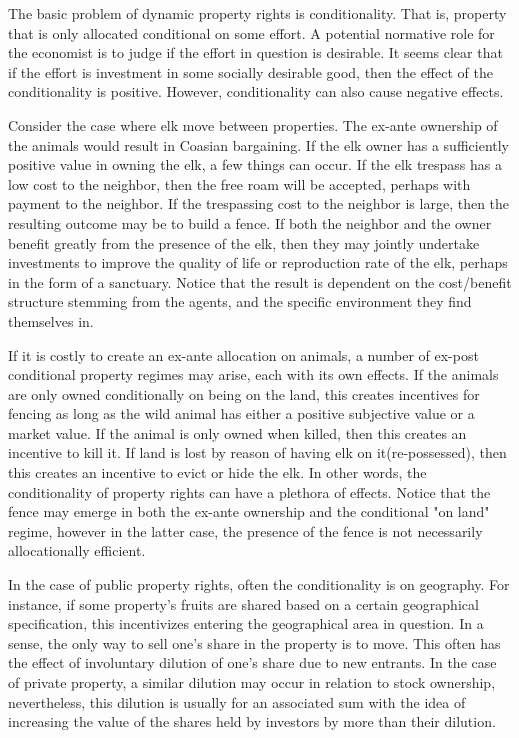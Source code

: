 The basic problem of dynamic property rights is conditionality. That is, property that is only allocated conditional on some effort. A potential normative role for the economist is to judge if the effort in question is desirable. It seems clear that if the effort is investment in some socially desirable good, then the effect of the conditionality is positive. However, conditionality can also cause negative effects. 

Consider the case where elk move between properties. The ex-ante ownership of the animals would result in Coasian bargaining. If the elk owner has a sufficiently positive value in owning the elk, a few things can occur. If the elk trespass has a low cost to the neighbor, then the free roam will be accepted, perhaps with payment to the neighbor. If the trespassing cost to the neighbor is large, then the resulting outcome may be to build a fence. If both the neighbor and the owner benefit greatly from the presence of the elk, then they may jointly undertake investments to improve the quality of life or reproduction rate of the elk, perhaps in the form of a sanctuary. Notice that the result is dependent on the cost/benefit structure stemming from the agents, and the specific environment they find themselves in. 

If it is costly to create an ex-ante allocation on animals, a number of ex-post conditional property regimes may arise, each with its own effects. If the animals are only owned conditionally on being on the land, this creates incentives for fencing as long as the wild animal has either a positive subjective value or a market value. If the animal is only owned when killed, then this creates an incentive to kill it. If land is lost by reason of having elk on it(re-possessed), then this creates an incentive to evict or hide the elk. In other words, the conditionality of property rights can have a plethora of effects. Notice that the fence may emerge in both the ex-ante ownership and the conditional "on land" regime, however in the latter case, the presence of the fence is not necessarily allocationally efficient. 


In the case of public property rights, often the conditionality is on geography. For instance, if some property's fruits are shared based on a certain geographical specification, this incentivizes entering the geographical area in question. In a sense, the only way to sell one's share in the property is to move. This often has the effect of involuntary dilution of one's share due to new entrants. In the case of private property, a similar dilution may occur in relation to stock ownership, nevertheless, this dilution is usually for an associated sum with the idea of increasing the value of the shares held by investors by more than their dilution.

